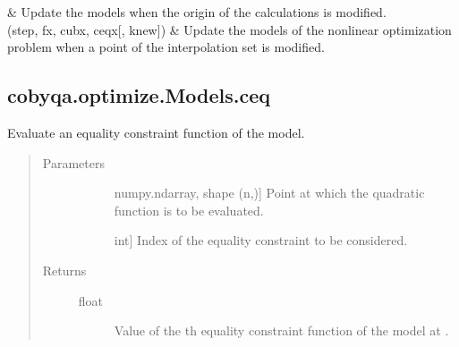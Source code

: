 \documentclass[letterpaper,10pt,english]{sphinxmanual}
\begin{document}
\begin{fulllineitems}
\begin{savenotes}
\begin{longtable}[c]{}
&
\sphinxAtStartPar
Update the models when the origin of the calculations is modified.
\\
\hline
\sphinxAtStartPar
{\hyperref[\detokenize{refs/generated/cobyqa.optimize.Models.update:cobyqa.optimize.Models.update}]{}}(step, fx, cubx, ceqx{[}, knew{]})
&
\sphinxAtStartPar
Update the models of the nonlinear optimization problem when a point of the interpolation set is modified.
\\
\hline
\end{longtable}\sphinxatlongtableend\end{savenotes}


\subsection{cobyqa.optimize.Models.ceq}
\label{\detokenize{refs/generated/cobyqa.optimize.Models.ceq:cobyqa-optimize-models-ceq}}\label{\detokenize{refs/generated/cobyqa.optimize.Models.ceq::doc}}

\begin{fulllineitems}
\label{\detokenize{refs/generated/cobyqa.optimize.Models.ceq:cobyqa.optimize.Models.ceq}}
\sphinxAtStartPar
Evaluate an equality constraint function of the model.
\begin{quote}\begin{description}
\item[{Parameters}] \leavevmode\begin{description}
\item[{}] \leavevmode{[}numpy.ndarray, shape (n,){]}
\sphinxAtStartPar
Point at which the quadratic function is to be evaluated.

\item[{}] \leavevmode{[}int{]}
\sphinxAtStartPar
Index of the equality constraint to be considered.

\end{description}

\item[{Returns}] \leavevmode\begin{description}
\item[{float}] \leavevmode
\sphinxAtStartPar
Value of the \sphinxhyphen{}th equality constraint function of the model at
.


\end{description}
\end{description}
\end{quote}
\end{fulllineitems}
\end{fulllineitems}
\end{document}

